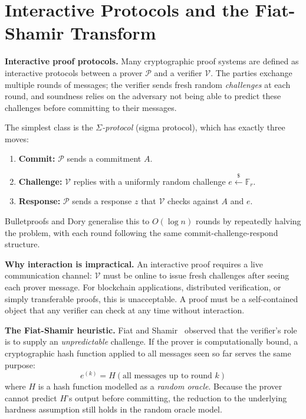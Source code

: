 \section{Interactive Protocols and the Fiat-Shamir Transform}
\label{sec:fiat-shamir}

\textbf{Interactive proof protocols.}
Many cryptographic proof systems are defined as interactive protocols
between a prover $\mathcal{P}$ and a verifier $\mathcal{V}$. The parties
exchange multiple rounds of messages; the verifier sends fresh random
\emph{challenges} at each round, and soundness relies on the adversary not
being able to predict these challenges before committing to their messages.

The simplest class is the \emph{$\Sigma$-protocol} (sigma protocol), which
has exactly three moves:
\begin{enumerate}
    \item \textbf{Commit:} $\mathcal{P}$ sends a commitment $A$.
    \item \textbf{Challenge:} $\mathcal{V}$ replies with a uniformly
          random challenge $e \xleftarrow{\$} \mathbb{F}_r$.
    \item \textbf{Response:} $\mathcal{P}$ sends a response $z$ that
          $\mathcal{V}$ checks against $A$ and $e$.
\end{enumerate}
Bulletproofs and Dory generalise this to $O(\log n)$ rounds by repeatedly
halving the problem, with each round following the same commit-challenge-respond
structure.

\textbf{Why interaction is impractical.}
An interactive proof requires a live communication channel: $\mathcal{V}$
must be online to issue fresh challenges after seeing each prover message.
For blockchain applications, distributed verification, or simply transferable
proofs, this is unacceptable. A proof must be a self-contained object that
any verifier can check at any time without interaction.

\textbf{The Fiat-Shamir heuristic.}
Fiat and Shamir~\cite{fiat1987} observed that the verifier's role is to
supply an \emph{unpredictable} challenge. If the prover is computationally
bound, a cryptographic hash function applied to all messages seen so far
serves the same purpose:
\begin{equation}
    e^{(k)} = H\!\left(\text{all messages up to round } k\right)
\end{equation}
where $H$ is a hash function modelled as a \emph{random oracle}. Because
the prover cannot predict $H$'s output before committing, the reduction to
the underlying hardness assumption still holds in the random oracle model.

